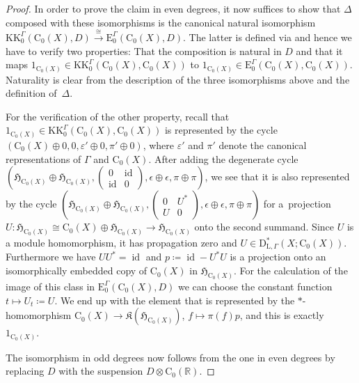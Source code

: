 \documentclass[pdftex]{sigma}
\numberwithin{equation}{section}
\theoremstyle{definition}
\newcommand{\R}{\mathbb{R}}
\newcommand{\Ct}{\mathrm{C}}
\newcommand{\Cz}{\Ct_0}
\newcommand{\HilbertMod}{\mathfrak{H}}
\DeclareMathOperator{\id}{id}
\newcommand{\KK}{\mathrm{KK}}
\newcommand{\EE}{\mathrm{E}}
\newcommand{\PseudoLocLoc}{\mathrm{D}^*_{\mathrm{L},\Gamma}}
\newcommand{\Kom}{{\mathfrak{K}}}
\begin{document}
\begin{proof}
In order to prove the claim in even degrees, it now suffices to show that $\Delta$ composed with these isomorphisms is the canonical natural isomorphism $\KK_0^\Gamma(\Cz(X),D)\xrightarrow{\cong}\EE_0^\Gamma(\Cz(X),D)$.
The latter is defined via \cite[Theorem~2.2]{Thomsen_univKK} and hence we have to verify two properties: That the composition is natural in $D$ and that it maps $1_{\Cz(X)}\in\KK_0^\Gamma(\Cz(X),\Cz(X))$ to $1_{\Cz(X)}\in\EE_0^\Gamma(\Cz(X),\Cz(X))$. Naturality is clear from the description of the three isomorphisms above and the definition of~$\Delta$.

For the verification of the other property, recall that $1_{\Cz(X)}\in\KK_0^\Gamma(\Cz(X),\Cz(X))$ is represented by the cycle $(\Cz(X)\oplus 0,0,\varepsilon'\oplus 0,\pi'\oplus 0)$, where $\varepsilon'$ and $\pi'$ denote the canonical representations of $\Gamma$ and $\Cz(X)$. After adding the degenerate cycle $\left(\HilbertMod_{\Cz(X)}\oplus\HilbertMod_{\Cz(X)}, \left(\begin{smallmatrix}0&\id\\\id&0\end{smallmatrix}\right)\!,\epsilon\oplus\epsilon,\pi\oplus\pi\right)$, we see that it is also represented by the cycle $\left(\HilbertMod_{\Cz(X)}\oplus\HilbertMod_{\Cz(X)}, \left(\begin{smallmatrix}0&U^*\\U&0\end{smallmatrix}\right)\!,\epsilon\oplus\epsilon,\pi\oplus\pi\right)$ for a~projection $U\colon \HilbertMod_{\Cz(X)}\cong\Cz(X)\oplus\HilbertMod_{\Cz(X)}\to\HilbertMod_{\Cz(X)}$ onto the second summand. Since $U$ is a module homomorphism, it has propagation zero and $U\in \PseudoLocLoc(X;\Cz(X))$. Furthermore we have $UU^*=\id$ and $p\coloneqq \id-U^*U$ is a projection onto an isomorphically embedded copy of $\Cz(X)$ in $\HilbertMod_{\Cz(X)}$.
For the calculation of the image of this class in $\EE_0^\Gamma(\Cz(X),D)$ we can choose the constant function $t\mapsto U_t\coloneqq U$. We end up with the element that is represented by the $*$-homomorphism $\Cz(X)\to \Kom(\HilbertMod_{\Cz(X)})$, $f\mapsto \pi(f)p$, and this is exactly $1_{\Cz(X)}$.

The isomorphism in odd degrees now follows from the one in even degrees by replacing $D$ with the suspension $D\otimes \Cz(\R)$.
\end{proof}
\end{document}
